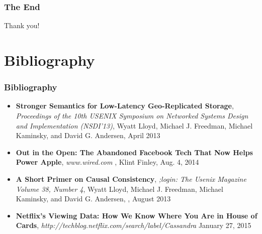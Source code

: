 \documentclass{beamer}
\begin{document}
\begin{frame}
\frametitle{The End}
\LARGE{Thank you!}
\end{frame}



\section{Bibliography} 

\begin{frame}
\frametitle{Bibliography}


\begin{itemize}
\item \textbf{Stronger Semantics for Low-Latency Geo-Replicated Storage}, 
\textit{Proceedings of the 10th USENIX Symposium on Networked Systems Design and Implementation (NSDI’13)}, 
Wyatt Lloyd, Michael J. Freedman, Michael Kaminsky, and David G. Andersen, 
April 2013

\item \textbf{Out in the Open: The Abandoned Facebook Tech That Now Helps Power Apple}, 
\textit{www.wired.com}
, Klint Finley, Aug. 4, 2014

\item \textbf{A Short Primer on Causal Consistency}, 
\textit{;login: The Usenix Magazine Volume 38, Number 4}, 
Wyatt Lloyd, Michael J. Freedman, Michael Kaminsky, and David G. Andersen, , August 2013

\item \textbf{Netflix's Viewing Data: How We Know Where You Are in House of Cards},
\textit{http://techblog.netflix.com/search/label/Cassandra}
January 27, 2015


\end{itemize}  
\end{frame}
\end{document}
